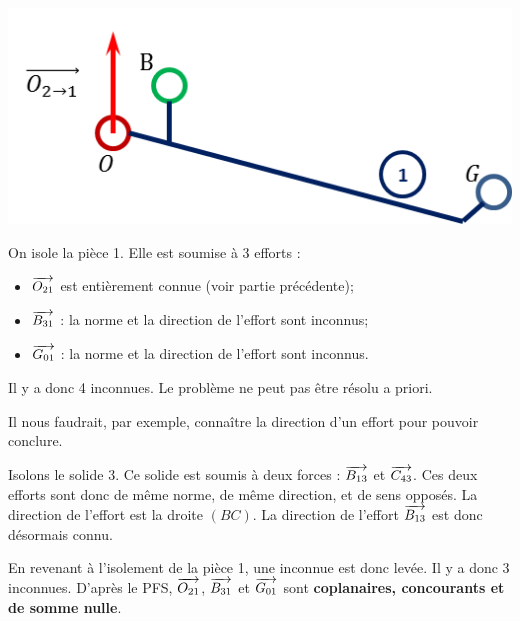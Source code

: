 \documentclass[11pt,oneside]{article}
\begin{document}
\begin{exemple}
\begin{minipage}[c]{.3\linewidth}
\begin{center}
\includegraphics[width=.95\textwidth]{png/1_F}
\end{center}
\end{minipage}
\hfill
\begin{minipage}[c]{.65\linewidth}
On isole la pièce 1. Elle est soumise à 3 efforts : 
\begin{itemize}
\item $\overrightarrow{O_{21}}$ est entièrement connue (voir partie précédente);
\item $\overrightarrow{B_{31}}$ : la norme et la direction de l'effort sont inconnus;
\item $\overrightarrow{G_{01}}$ : la norme et la direction de l'effort sont inconnus.
\end{itemize}

Il y a donc 4 inconnues. Le problème ne peut pas être résolu a priori. 


Il nous faudrait, par exemple, connaître la direction d'un effort pour pouvoir conclure. 

Isolons le solide 3. Ce solide est soumis à deux forces : $\overrightarrow{B_{13}}$ et $\overrightarrow{C_{43}}$. Ces deux efforts sont donc de même norme, de même direction, et de sens opposés. La direction de l'effort est la droite $(BC)$. La direction de l'effort $\overrightarrow{B_{13}}$ est donc désormais connu.

En revenant à l'isolement de la pièce 1, une inconnue est donc levée. Il y a donc 3 inconnues. D'après le PFS, $\overrightarrow{O_{21}}$, $\overrightarrow{B_{31}}$ et $\overrightarrow{G_{01}}$ sont \textbf{coplanaires, concourants et de somme nulle}.

\end{minipage}
\end{exemple}
\end{document}
